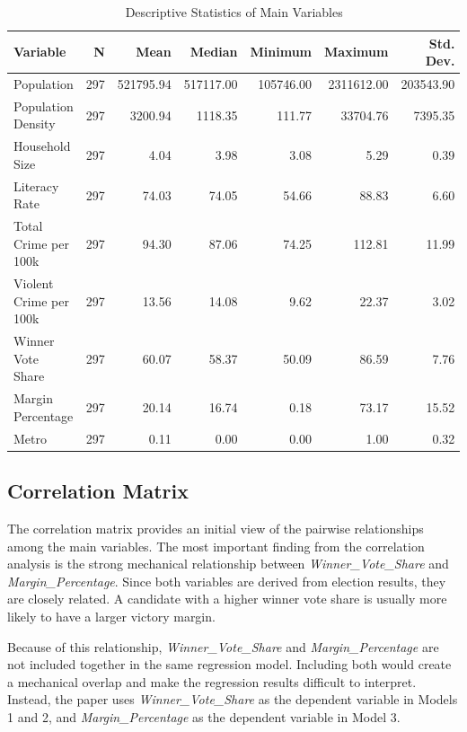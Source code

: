\documentclass[12pt,a4paper]{article}
\begin{document}
\begin{table}[H]
\centering
\caption{Descriptive Statistics of Main Variables}
\label{tab:descriptive_statistics}
\footnotesize
\renewcommand{\arraystretch}{1.2}
\begin{tabular}{lrrrrrr}
\toprule
\textbf{Variable} & \textbf{N} & \textbf{Mean} & \textbf{Median} & \textbf{Minimum} & \textbf{Maximum} & \textbf{Std. Dev.} \\
\midrule
Population & 297 & 521795.94 & 517117.00 & 105746.00 & 2311612.00 & 203543.90 \\
Population Density & 297 & 3200.94 & 1118.35 & 111.77 & 33704.76 & 7395.35 \\
Household Size & 297 & 4.04 & 3.98 & 3.08 & 5.29 & 0.39 \\
Literacy Rate & 297 & 74.03 & 74.05 & 54.66 & 88.83 & 6.60 \\
Total Crime per 100k & 297 & 94.30 & 87.06 & 74.25 & 112.81 & 11.99 \\
Violent Crime per 100k & 297 & 13.56 & 14.08 & 9.62 & 22.37 & 3.02 \\
Winner Vote Share & 297 & 60.07 & 58.37 & 50.09 & 86.59 & 7.76 \\
Margin Percentage & 297 & 20.14 & 16.74 & 0.18 & 73.17 & 15.52 \\
Metro & 297 & 0.11 & 0.00 & 0.00 & 1.00 & 0.32 \\
\bottomrule
\end{tabular}
\end{table}

\subsection{Correlation Matrix}

The correlation matrix provides an initial view of the pairwise relationships among the main variables. The most important finding from the correlation analysis is the strong mechanical relationship between \textit{Winner\_Vote\_Share} and \textit{Margin\_Percentage}. Since both variables are derived from election results, they are closely related. A candidate with a higher winner vote share is usually more likely to have a larger victory margin.

Because of this relationship, \textit{Winner\_Vote\_Share} and \textit{Margin\_Percentage} are not included together in the same regression model. Including both would create a mechanical overlap and make the regression results difficult to interpret. Instead, the paper uses \textit{Winner\_Vote\_Share} as the dependent variable in Models 1 and 2, and \textit{Margin\_Percentage} as the dependent variable in Model 3.
\end{document}
